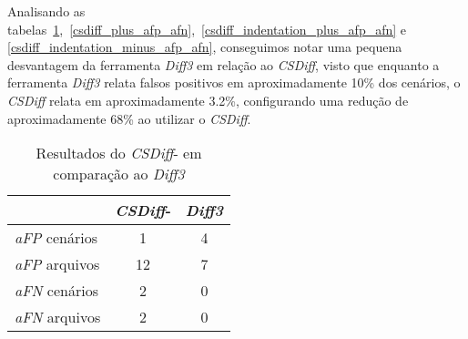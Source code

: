Analisando as
tabelas~\ref{csdiff_minus_afp_afn},~\ref{csdiff_plus_afp_afn},~\ref{csdiff_indentation_plus_afp_afn}
e \ref{csdiff_indentation_minus_afp_afn}, conseguimos notar uma pequena
desvantagem da ferramenta \emph{Diff3} em relação ao \emph{CSDiff}, visto que
enquanto a ferramenta \emph{Diff3} relata falsos positivos em aproximadamente
10\% dos cenários, o \emph{CSDiff} relata em aproximadamente 3.2\%,
configurando uma redução de aproximadamente 68\% ao utilizar o \emph{CSDiff}.

\begin{table}[ht]
	\begin{center}
		\begin{tabular}{|l|c|c|}
			\hline
			\textbf{ }          & \textbf{\emph{CSDiff}-} & \textbf{\emph{Diff3}} \\
			\hline
			\emph{aFP} cenários & 1                       & 4                     \\
			\emph{aFP} arquivos & 12                      & 7                     \\
			\emph{aFN} cenários & 2                       & 0                     \\
			\emph{aFN} arquivos & 2                       & 0                     \\
			\hline
		\end{tabular}
	\end{center}
	\caption{Resultados do \emph{CSDiff}- em comparação ao \emph{Diff3}}\label{csdiff_minus_afp_afn}
\end{table}

